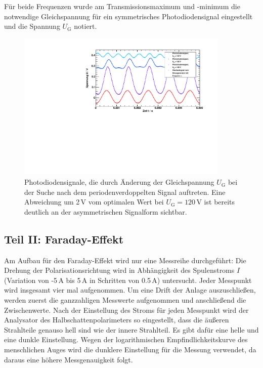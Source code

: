 Für beide Frequenzen wurde am Transmissionsmaximum und -minimum
die notwendige Gleichspannung für ein symmetrisches
Photodiodensignal eingestellt und die Spannung $U_{\text{G}}$ notiert.

\begin{figure}[H]
\begin{center}
  \includegraphics[width=0.9\textwidth]{../img/pockdurchf.pdf}
  \caption{Photodiodensignale, die durch Änderung der Gleichspannung $U_\text{G}$
  bei der Suche nach dem periodenverdoppelten Signal auftreten.
  Eine Abweichung um 2\,V vom optimalen Wert bei $U_\text{G}=120$\,V ist bereits deutlich 
  an der asymmetrischen Signalform sichtbar.}
  \label{img:pockdurchf}
\end{center}
\end{figure}


\subsection{Teil II: Faraday-Effekt}

Am Aufbau für den Faraday-Effekt wird nur eine Messreihe durchgeführt:
Die Drehung der Polarisationsrichtung wird in Abhängigkeit des Spulenstroms $I$
(Variation von -5\,A bis 5\,A in Schritten von 0.5\,A) untersucht.
Jeder Messpunkt wird insgesamt vier mal aufgenommen.
Um eine Drift der Anlage auszuschließen,
werden zuerst die ganzzahligen Messwerte aufgenommen und anschließend die
Zwischenwerte.
Nach der Einstellung des Stroms für jeden Messpunkt wird der Analysator
des Halbschattenpolarimeters so eingestellt, dass die äußeren Strahlteile genauso hell sind wie der innere
Strahlteil.
Es gibt dafür eine helle und eine dunkle Einstellung.
Wegen der logarithmischen Empfindlichkeitskurve des menschlichen Auges wird die dunklere Einstellung
für die Messung verwendet, da daraus eine höhere Messgenauigkeit folgt.
